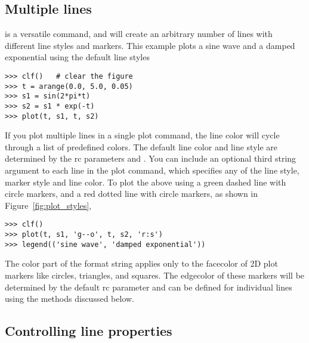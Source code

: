 \documentclass[]{book}
\begin{document}
\subsection{Multiple lines}
\label{sec:plot_multiple_lines}

 is a versatile command, and will create an arbitrary
number of lines with different line styles and markers.  This example
plots a sine wave and a damped exponential using the default line styles

\begin{lstlisting}
>>> clf()   # clear the figure
>>> t = arange(0.0, 5.0, 0.05)
>>> s1 = sin(2*pi*t)
>>> s2 = s1 * exp(-t)
>>> plot(t, s1, t, s2)
\end{lstlisting}

\noindent If you plot multiple lines in a single plot command, the
line color will cycle through a list of predefined colors.  The
default line color and line style are determined by the rc parameters
 and .  You can include an optional
third string argument to each line in the plot command, which
specifies any of the line style, marker style and line color.  To plot
the above using a green dashed line with circle markers, and a red
dotted line with circle markers, as shown in
Figure~\ref{fig:plot_styles}, 

\begin{lstlisting}
>>> clf()   
>>> plot(t, s1, 'g--o', t, s2, 'r:s')
>>> legend(('sine wave', 'damped exponential'))
\end{lstlisting}


\noindent The color part of the format string applies only to the
facecolor of 2D plot markers like circles, triangles, and squares.
The edgecolor of these markers will be determined by the default rc
parameter  and can be defined for individual
lines using the methods discussed below.

\subsection{Controlling line properties}
\label{sec:plot_line_props}
\end{document}
